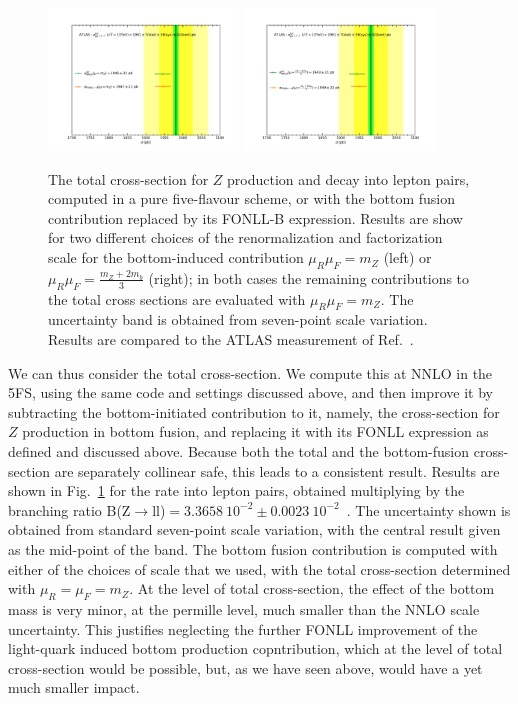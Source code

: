 \documentclass[12pt]{article}
\begin{document}
\begin{figure}
  \begin{center}
    \includegraphics[width=0.45\textwidth]{tot_xs_mz.pdf}
    \includegraphics[width=0.45\textwidth]{tot_xsmzmb.pdf} 
    \caption{\label{fig:ztotal}
The total cross-section for $Z$ production and decay into lepton
pairs, 
computed in a pure
five-flavour scheme, or with the bottom fusion contribution replaced
by its FONLL-B expression. Results are show for two different choices
of the renormalization and factorization scale  for the bottom-induced
contribution $\mu_R\mu_F=m_Z$ (left) or
$\mu_R\mu_F=\frac{m_Z+2m_b}{3}$ (right); in both cases the remaining
contributions to the total cross sections are evaluated with
$\mu_R\mu_F=m_Z$. The uncertainty band is obtained from seven-point
scale variation.
 Results are compared to the ATLAS measurement of
Ref.~\cite{Aad:2016naf}. }
  \end{center}
\end{figure}
%
We can thus consider the total cross-section. We compute this 
at NNLO in
the 5FS, using the same code and settings discussed above, and then
improve it by  subtracting
the bottom-initiated contribution to it, namely, the cross-section for
$Z$ production in bottom fusion, and  
replacing it with its FONLL expression as defined and discussed
above. Because both the total and the bottom-fusion cross-section are
separately collinear safe, this leads to a consistent result.
Results are shown in Fig.~\ref{fig:ztotal} for the rate into
lepton pairs, obtained multiplying by the branching ratio B(Z$\to$ll)$=3.3658~10^{-2}\pm 0.0023~10^{-2}$~\cite{Tanabashi:2018oca}. The uncertainty shown is
obtained from standard seven-point scale variation, with the central
result given as the mid-point of the band.  The bottom fusion
contribution is computed with either of the choices of scale that we
used, with the total cross-section determined with $\mu_R=\mu_F=m_Z$. 
At the level of total cross-section, the effect of the
bottom mass is very minor, at the permille level, much smaller
than the NNLO scale uncertainty. This justifies neglecting the further
FONLL improvement of the light-quark induced bottom production
copntribution, which at the level of total cross-section would be
possible, but, as we have seen above, would have a yet much smaller
impact. 
\end{document}
